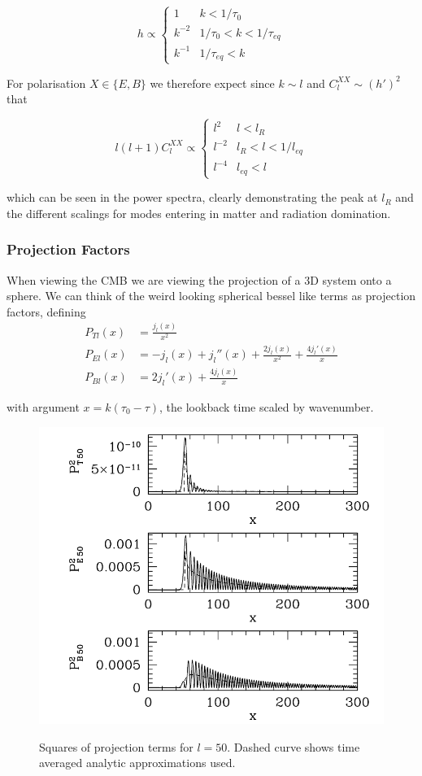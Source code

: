 \documentclass[a4paper,10pt]{article}
\begin{document}
\begin{equation}
  h \propto
    \begin{cases}
      1 & k<1/\tau_0\\
      k^{-2} & 1/\tau_0<k<1/\tau_{eq}\\
      k^{-1} & 1/\tau_{eq}<k
    \end{cases}       
\end{equation}

For polarisation $X\in\{E,B\}$ we therefore expect since $k\sim l$ and $C_l^{XX}\sim (h')^2$ that

\begin{equation}
  l(l+1)C_l^{XX} \propto
    \begin{cases}
      l^2 & l<l_R\\
      l^{-2} & l_R<l<1/l_{eq}\\
      l^{-4} & l_{eq}<l
    \end{cases}       
\end{equation}

which can be seen in the power spectra, clearly demonstrating the peak at $l_R$ and the different scalings for modes entering in matter and radiation domination.


\subsubsection{Projection Factors}

When viewing the CMB we are viewing the projection of a 3D system onto a sphere. We can think of the weird looking spherical bessel like terms as projection factors, defining
\begin{align}
P_{Tl}(x) &= \frac{j_l(x)}{x^2}\\
P_{El}(x) &= -j_l(x) +j_l''(x)+\frac{2j_l(x)}{x^2} + \frac{4j_l'(x)}{x}\\
P_{Bl}(x) &= 2j_l'(x)+\frac{4j_l(x)}{x}
\end{align}

with argument $x=k(\tau_0-\tau)$, the lookback time scaled by wavenumber. 

\begin{figure}[h]
  \includegraphics[width=0.7\linewidth]{projection.png}
  \label{proj}
  \centering
  \caption{Squares of projection terms for $l=50$. Dashed curve shows time averaged analytic approximations used.}
\end{figure}
\end{document}

